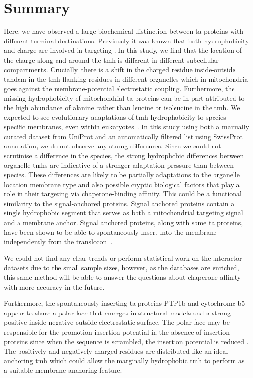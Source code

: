 \section{Summary}

Here, we have observed a large biochemical distinction between \gls{ta} proteins with different terminal destinations.
Previously it was known that both hydrophobicity and charge are involved in targeting \cite{Costello2017}.
In this study, we find that the location of the charge along and around the \gls{tmh} is different in different subcellular compartments.
Crucially, there is a shift in the charged residue inside\--outside tandem in the \gls{tmh} flanking residues in different organelles which in mitochondria goes against the membrane\--potential electrostatic coupling.
Furthermore, the missing hydrophobicity of mitochondrial \gls{ta} proteins can be in part attributed to the high abundance of alanine rather than leucine or isoleucine in the \gls{tmh}.
We expected to see evolutionary adaptations of \gls{tmh} hydrophobicity to species-specific membranes, even within eukaryotes~\cite{Baker2017, Sharpe2010}.
In this study using both a manually curated dataset from UniProt and an automatically filtered list using SwissProt annotation, we do not observe any strong differences.
Since we could not scrutinise a difference in the species, the strong hydrophobic differences between organelle \gls{tmh}s are indicative of a stronger adaptation pressure than between species.
These differences are likely to be partially adaptations to the organelle location membrane type and also possible cryptic biological factors that play a role in their targeting via chaperone\--binding affinity.
This could be a functional similarity to the signal-anchored proteins.
Signal anchored proteins contain a single hydrophobic segment that serves as both a mitochondrial targeting signal and a membrane anchor.
Signal anchored proteins, along with some \gls{ta} proteins, have been shown to be able to spontaneously insert into the membrane independently from the translocon~\cite{Elisa2012, Lan2000, Colombo2009}.

We could not find any clear trends or perform statistical work on the interactor datasets due to the small sample sizes, however, as the databases are enriched, this same method will be able to answer the questions about chaperone affinity with more accuracy in the future.

Furthermore, the spontaneously inserting \gls{ta} proteins PTP1b and cytochrome b5 appear to share a polar face that emerges in structural models and a strong positive\--inside negative\--outside electrostatic surface.
The polar face may be responsible for the promotion insertion potential in the absence of insertion proteins since when the sequence is scrambled, the insertion potential is reduced \cite{Brambillasca2006}.
The positively and negatively charged residues are distributed like an ideal anchoring \gls{tmh} \cite{Baker2017} which could allow the marginally hydrophobic \gls{tmh} to perform as a suitable membrane anchoring feature.
